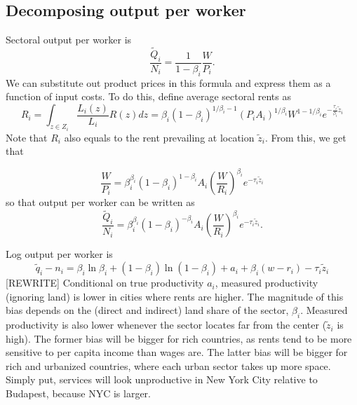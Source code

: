 \documentclass[12pt]{article}
\begin{document}
\subsection{Decomposing output per worker}
Sectoral output per worker is
\[
\frac{\tilde Q_i}{N_i} = \frac1{1-\beta_i}
\frac{W}{P_i}.
\]
We can substitute out product prices in this formula and express them as a function of input costs. To do this, define average sectoral rents as
\begin{equation}
R_i =\int_{z\in Z_i}\frac{L_i(z)}{L_i}R(z)dz = \beta_i(1-\beta_i)^{1/\beta_i-1} \left(P_iA_i\right)^{1/\beta_i} W^{1-1/\beta_i} e^{-\frac{\tau_i}{\beta_i} \tilde{z}_i}
\end{equation}
Note that $R_i$ also equals to the rent prevailing at location $\tilde z_i$. From this, we get that

\[
\frac{W}{P_i}  =\beta_i^{\beta_i}(1-\beta_i)^{1-\beta_i}
A_i
\left(\frac{W}{R_i}\right)^{\beta_i}
 e^{-\tau_i \tilde z_i}
\]
so that output per worker can be written as
\begin{equation}
\frac{\tilde Q_i}{N_i} = \beta_i^{\beta_i}(1-\beta_i)^{-\beta_i}
A_i
\left(\frac{W}{R_i}\right)^{\beta_i}e^{-\tau_i \tilde z_i}.
\end{equation}

Log output per worker is
\[
\tilde q_i - n_i =
\beta_i\ln\beta_i+(1-\beta_i)\ln(1-\beta_i)
+a_i +\beta_i (w
-r_i)
- \tau_{i}\tilde z_{i}
\]
[REWRITE]
Conditional on true productivity $a_i$, measured productivity (ignoring land) is lower in cities where rents are higher. The magnitude of this bias depends on the (direct and indirect) land share of the sector, $\beta_i$. Measured productivity is also lower whenever the sector locates far from the center ($\tilde z_i$ is high). %
The former bias will be bigger for rich countries, as rents tend to be more sensitive to per capita income than wages are. The latter bias will be bigger for rich and urbanized countries, where each urban sector takes up more space. Simply put, services will look unproductive in New York City relative to Budapest, because NYC is larger.
\end{document}
